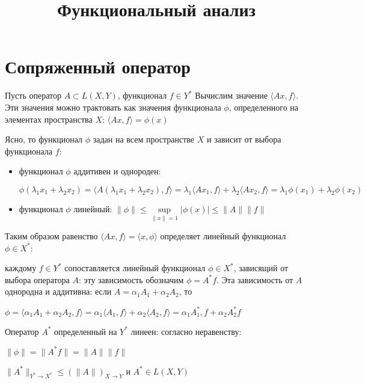 \documentclass[12pt,a4paper,titlepage]{book}
\title{Функциональный анализ}
\theoremstyle{plain}
\theoremstyle{remark}
\theoremstyle{remark}
\theoremstyle{plain}
\begin{document}
\par\section*{Сопряженный оператор}
Пусть оператор $A \subset L(X,Y)$, функционал $f \in Y^*$ Вычислим значение $\langle Ax, f \rangle$. Эти значения можно трактовать как значения функционала $\phi$, определенного на элементах пространства $X$: $\langle Ax, f \rangle = \phi (x)$

Ясно, то функционал $\phi$ задан на всем пространстве $X$ и зависит от выбора функционала $f$:
\begin{itemize}
\item функционал $\phi$ аддитивен и однороден: 
\begin{flushleft}
$\phi (\lambda_1 x_1+\lambda_2 x_2) = \langle A(\lambda_1 x_1+\lambda_2 x_2), f \rangle = \lambda_1 \langle Ax_1, f \rangle + \lambda_2 \langle Ax_2, f \rangle = \lambda_1 \phi(x_1) + \lambda_2 \phi(x_2)$
\end{flushleft}
\item функционал $\phi$ линейный: $\parallel \phi \parallel \le \sup\limits_{\parallel x \parallel = 1} \lvert \phi (x) \rvert \le \parallel A \parallel \parallel f \parallel $

\end{itemize}
Таким образом равенство $\langle Ax, f \rangle = \langle x, \phi \rangle$ определяет линейный функционал $\phi \in X^{*}$:

каждому $f\in Y^{*}$ сопоставляется линейный функционал $\phi \in X^{*}$, зависящий от выбора оператора $A$: эту зависимость обозначим $\phi = A^{*}f$.
Эта зависимость от $A$ однородна и аддитивна:
если $A=\alpha_1 A_1 + \alpha_2 A_2$, то
\begin{flushleft}
 $\phi = \langle \alpha_1 A_1 + \alpha_2 A_2, f \rangle = \alpha_1 \langle A_1, f \rangle + \alpha_2 \langle A_2, f \rangle = \alpha_1 A_1^{*}, f + \alpha_2 A_2^{*}f$
\end{flushleft}
Оператор $A^{*}$ определенный на $Y^{*}$ линеен: согласно неравенству:
\begin{flushleft}
$\parallel \phi \parallel = \parallel A^{*}f \parallel = \parallel A \parallel \parallel f \parallel$
\end{flushleft}
\begin{flushleft}
$\parallel A^{*} \parallel_{Y^{*} \to X^{*}}\le (\parallel A \parallel)_{X \to Y}$ и $ A^{*} \in L(X,Y)$
\end{flushleft}
\end{document}
